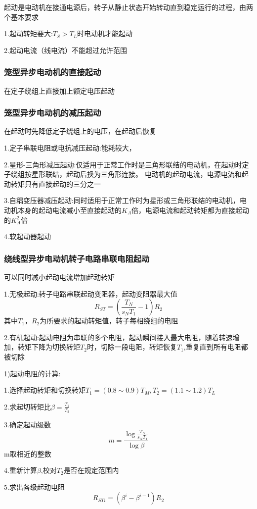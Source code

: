 \documentclass[11pt,twoside,a4paper]{ctexart}
\begin{document}
起动是电动机在接通电源后，转子从静止状态开始转动直到稳定运行的过程，由两个基本要求

1.起动转矩要大:$T_S > T_L$时电动机才能起动

2.起动电流（线电流）不能超过允许范围

\subsubsection{笼型异步电动机的直接起动}

在定子绕组上直接加上额定电压起动

\subsubsection{笼型异步电动机的减压起动}

在起动时先降低定子绕组上的电压，在起动后恢复

1.定子串联电阻或电抗减压起动:能耗较大，

2.星形-三角形减压起动:仅适用于正常工作时是三角形联结的电动机，在起动时定子绕组按星形联结，起动后换为三角形连接。
电动机的起动电流，电源电流和起动转矩只有直接起动的三分之一

3.自耦变压器减压起动:同时适用于正常工作时为星形或三角形联结的电动机，电动机本身的起动电流减小至直接起动的$K_A$倍，电源电流和起动转矩都为直接起动的$K_A^2$倍

4.软起动器起动

\subsubsection{绕线型异步电动机转子电路串联电阻起动}

可以同时减小起动电流增加起动转矩

1.无极起动:转子电路串联起动变阻器，起动变阻器最大值
\[R_{ST} = (\frac{T_N}{s_NT_1} - 1)R_2\]
其中$T_1，R_2$为所要求的起动转矩值，转子每相绕组的电阻

2.有机起动:起动电阻为串联的多个电阻，起动瞬间接入最大电阻，随着转速增加，转矩下降为切换转矩$T_2$时，切除一段电阻，转矩恢复$T_1$,重复直到所有电阻都被切除

1)起动电阻的计算:
\begin{minipage}[t]{0.9\linewidth}

    1.选择起动转矩和切换转矩$T_1 = (0.8 \sim 0.9)T_M,T_2 = (1.1 \sim 1.2)T_L$

    2.求起切转矩比$\beta = \frac{T_1}{T_2}$

    3.确定起动级数
    \[m = \frac{\log \frac{T_N}{s_NT_1}}{\log \beta }\]
    m取相近的整数

    4.重新计算$\beta $,校对$T_2$是否在规定范围内

    5.求出各级起动电阻
    \[R_{STi} = (\beta ^i - \beta ^{i - 1})R_2\]

\end{minipage}
\end{document}
